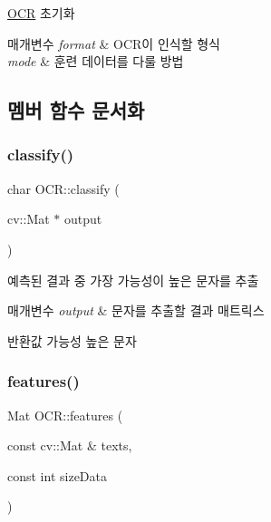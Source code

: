 \hyperlink{class_o_c_r}{O\+CR} 초기화 


\begin{DoxyParams}{매개변수}
{\em format} & O\+C\+R이 인식할 형식 \\
\hline
{\em mode} & 훈련 데이터를 다룰 방법 \\
\hline
\end{DoxyParams}


\subsection{멤버 함수 문서화}
\mbox{\label{class_o_c_r_a3d521746f28d2843381c7d7e5eedddcd}} 
\subsubsection{\texorpdfstring{classify()}{classify()}}
{\footnotesize\ttfamily char O\+C\+R\+::classify (\begin{DoxyParamCaption}\item[{cv\+::\+Mat $\ast$}]{output }\end{DoxyParamCaption})}



예측된 결과 중 가장 가능성이 높은 문자를 추출 


\begin{DoxyParams}{매개변수}
{\em output} & 문자를 추출할 결과 매트릭스 \\
\hline
\end{DoxyParams}
\begin{DoxyReturn}{반환값}
가능성 높은 문자 
\end{DoxyReturn}
\mbox{\label{class_o_c_r_ada88a7c2579124895eb6f19383749e9c}} 
\subsubsection{\texorpdfstring{features()}{features()}}
{\footnotesize\ttfamily Mat O\+C\+R\+::features (\begin{DoxyParamCaption}\item[{const cv\+::\+Mat \&}]{texts,  }\item[{const int}]{size\+Data }\end{DoxyParamCaption})\hspace{0.3cm}{\ttfamily [static]}}



